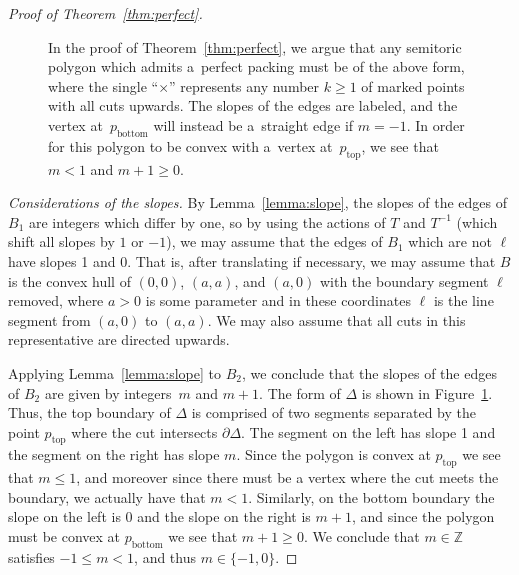 \documentclass[pdftex]{sigma}
\numberwithin{equation}{section}
\newcommand{\triangleline}{dashed}
\def\Z{{\mathbb Z}}
\newcommand{\De}{\Delta}
\begin{document}
\begin{proof}[Proof of Theorem~\ref{thm:perfect}]
\begin{figure}[t]
 \centering
 \caption{In the proof of Theorem~\ref{thm:perfect}, we argue that any semitoric polygon which admits a~perfect packing must be of the above form, where the single ``$\times$'' represents any number $k\geq 1$ of marked points with all cuts upwards. The slopes of the edges are labeled, and the vertex at~$p_{\text{bottom}}$ will instead be a~straight edge if $m=-1$.
 In order for this polygon to be convex with a~vertex at~$p_{\text{top}}$, we see that $m<1$ and $m+1\geq 0$.}
 \label{fig:slopes}
\end{figure}

{\it Considerations of the slopes.}
By Lemma~\ref{lemma:slope}, the slopes of the edges of $B_1$ are integers which differ by one, so by using the actions of $T$ and $T^{-1}$ (which shift all slopes by $1$ or $-1$), we may assume that the edges of $B_1$ which are not $\ell$ have slopes 1 and 0. That is, after translating if necessary, we may assume that $B$ is the convex hull of $(0,0)$, $(a,a)$, and $(a,0)$ with the boundary segment $\ell$ removed, where $a>0$ is some parameter and in these coordinates $\ell$ is the line segment from $(a,0)$ to $(a,a)$.
We may also assume that all cuts in this representative are directed upwards.

Applying Lemma~\ref{lemma:slope} to $B_2$, we conclude that the slopes of the edges of $B_2$ are given by integers~$m$ and $m+1$.
The form of $\De$ is shown in Figure~\ref{fig:slopes}.
Thus, the top boundary of $\De$ is comprised of two segments separated by the point $p_{\text{top}}$ where the cut intersects $\partial \De$.
The segment on the left has slope 1 and the segment on the right has slope $m$.
Since the polygon is convex at $p_{\text{top}}$ we see that $m\leq 1$, and moreover since there must be a vertex where the cut meets the boundary, we actually have that $m<1$.
Similarly, on the bottom boundary the slope on the left is 0 and the slope on the right is $m+1$, and since the polygon must be convex at $p_{\text{bottom}}$ we see that $m+1\geq 0$.
We conclude that $m\in\Z$ satisfies $-1\leq m < 1$, and thus $m\in\{-1,0\}$.


\end{proof}
\end{document}
